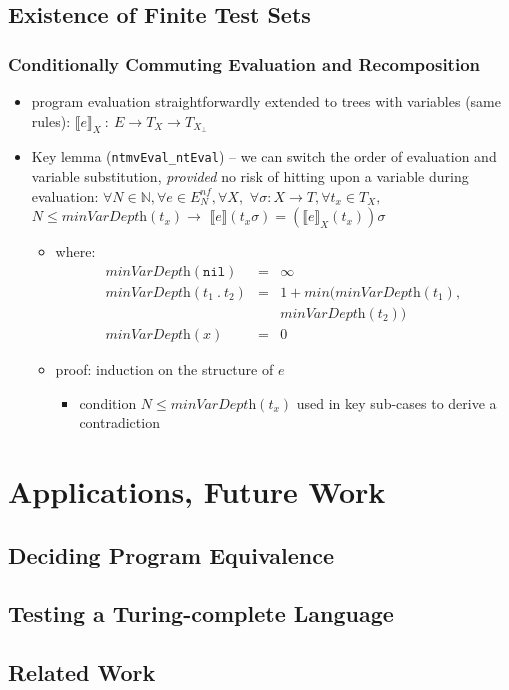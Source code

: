 \documentclass{beamer}
\begin{document}
\subsection{Existence of Finite Test Sets}

\begin{frame}
  \frametitle{Conditionally Commuting Evaluation and Recomposition}
  \begin{itemize}
    \item program evaluation straightforwardly extended to trees with variables
      (same rules):
      $\llbracket e \rrbracket_X ~:~ E \rightarrow T_X \rightarrow T_{X_\perp}$
    \item Key lemma (\texttt{ntmvEval\_ntEval}) -- we can switch the order of evaluation 
      and variable substitution, \emph{provided} no risk of hitting upon a variable
      during evaluation:
      $\forall N \in \mathbb{N}, \forall e \in E^{nf}_N, \forall X,$
      $\forall \sigma : X \rightarrow T, \forall t_x \in T_X,$
      $N \le \textit{minVarDepth}(t_x) \rightarrow$
      $\llbracket e \rrbracket(t_x\sigma) = (\llbracket e \rrbracket_X(t_x))\sigma$
      \begin{itemize}
        \item where:
        \[\begin{array}{lcl}
        \textit{minVarDepth}(\texttt{nil}) & = & \infty \\
        \textit{minVarDepth}(t_1 ~.~ t_2) & = & 1 + \textit{min}(\textit{minVarDepth}(t_1), \\
                                          &   &  \textit{minVarDepth}(t_2)) \\
        \textit{minVarDepth}(x) & = & 0
        \end{array}
        \]
        \item proof: induction on the structure of $e$
          \begin{itemize}
            \item condition $N \le \textit{minVarDepth}(t_x)$ used in key sub-cases
              to derive a contradiction
          \end{itemize}
      \end{itemize}
  \end{itemize}
\end{frame}

\section{Applications, Future Work}

\subsection{Deciding Program Equivalence}

\subsection{Testing a Turing-complete Language}

\subsection{Related Work} %
\end{document}
